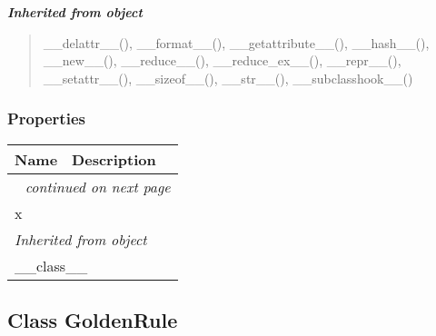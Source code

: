 \large{\textbf{\textit{Inherited from object}}}

\begin{quote}
\_\_delattr\_\_(), \_\_format\_\_(), \_\_getattribute\_\_(), \_\_hash\_\_(), \_\_new\_\_(), \_\_reduce\_\_(), \_\_reduce\_ex\_\_(), \_\_repr\_\_(), \_\_setattr\_\_(), \_\_sizeof\_\_(), \_\_str\_\_(), \_\_subclasshook\_\_()
\end{quote}


  \subsubsection{Properties}

    \vspace{-1cm}
\hspace{\varindent}\begin{longtable}{|p{\varnamewidth}|p{\vardescrwidth}|l}
\cline{1-2}
\cline{1-2} \centering \textbf{Name} & \centering \textbf{Description}& \\
\cline{1-2}
\endhead\cline{1-2}\multicolumn{3}{r}{\small\textit{continued on next page}}\\\endfoot\cline{1-2}
\endlastfoot\raggedright x\- & &\\
\cline{1-2}
\multicolumn{2}{|l|}{\textit{Inherited from object}}\\
\multicolumn{2}{|p{\varwidth}|}{\raggedright \_\_class\_\_}\\
\cline{1-2}
\end{longtable}



\subsection{Class GoldenRule}

